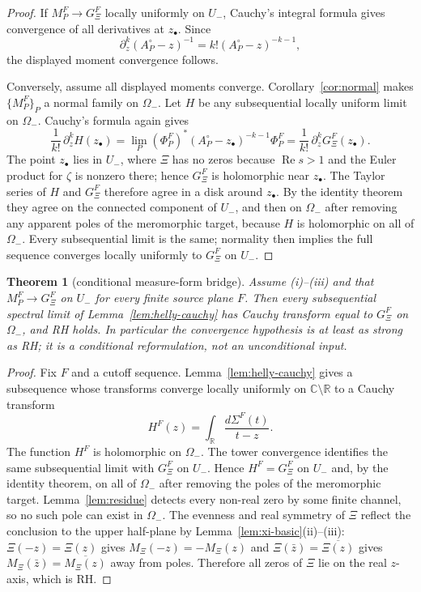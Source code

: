 \documentclass[11pt]{amsart}
\newtheorem{theorem}{Theorem}[section]
\theoremstyle{definition}
\theoremstyle{remark}
\theoremstyle{definition}
\renewcommand{\Re}{\operatorname{Re}}
\newcommand{\R}{\mathbb{R}}
\newcommand{\C}{\mathbb{C}}
\newcommand{\GXi}{G_\Xi}
\begin{document}
\begin{proof}
If $M_P^F\to\GXi^F$ locally uniformly on $U_-$, Cauchy's integral formula gives convergence of all
derivatives at $z_\bullet$.  Since
\[
   \partial_z^k(A_P^\circ-z)^{-1}=k!(A_P^\circ-z)^{-k-1},
\]
the displayed moment convergence follows.

Conversely, assume all displayed moments converge.  Corollary~\ref{cor:normal} makes
$\{M_P^F\}_P$ a normal family on $\Omega_-$.  Let $H$ be any subsequential locally uniform limit on
$\Omega_-$.  Cauchy's formula again gives
\[
   \frac{1}{k!}\,\partial_z^kH(z_\bullet)
   =
   \lim_P(\Phi_P^F)^*(A_P^\circ-z_\bullet)^{-k-1}\Phi_P^F
   =
   \frac{1}{k!}\,\partial_z^k\GXi^F(z_\bullet).
\]
The point $z_\bullet$ lies in $U_-$, where $\Xi$ has no zeros because $\Re s>1$ and the Euler product for
$\zeta$ is nonzero there; hence $\GXi^F$ is holomorphic near $z_\bullet$.  The Taylor series of $H$ and
$\GXi^F$ therefore agree in a disk around $z_\bullet$.  By the identity theorem they agree on the
connected component of $U_-$, and then on $\Omega_-$ after removing any apparent poles of the meromorphic
target, because $H$ is holomorphic on all of $\Omega_-$.  Every subsequential limit is the same; normality
then implies the full sequence converges locally uniformly to $\GXi^F$ on $U_-$.
\end{proof}

\begin{theorem}[conditional measure-form bridge]\label{thm:measure-bridge}
Assume \textnormal{(i)--(iii)} and that $M_P^F\to\GXi^F$ on $U_-$ for every finite source plane $F$.
Then every subsequential spectral limit of Lemma~\ref{lem:helly-cauchy} has Cauchy transform equal to
$\GXi^F$ on $\Omega_-$, and RH holds.  In particular the convergence hypothesis is at least as strong
as RH; it is a conditional reformulation, not an unconditional input.
\end{theorem}

\begin{proof}
Fix $F$ and a cutoff sequence.  Lemma~\ref{lem:helly-cauchy} gives a subsequence whose transforms converge
locally uniformly on $\C\setminus\R$ to a Cauchy transform
\[
   H^F(z)=\int_\R\frac{d\Sigma^F(t)}{t-z}.
\]
The function $H^F$ is holomorphic on $\Omega_-$.  The tower convergence identifies the same
subsequential limit with $\GXi^F$ on $U_-$.  Hence $H^F=\GXi^F$ on $U_-$ and, by the identity theorem,
on all of $\Omega_-$ after
removing the poles of the meromorphic target.  Lemma~\ref{lem:residue} detects every non-real zero by
some finite channel, so no such pole can exist in $\Omega_-$.  The evenness and real symmetry of $\Xi$
reflect the conclusion to the upper half-plane by Lemma~\ref{lem:xi-basic}(ii)--(iii):
$\Xi(-z)=\Xi(z)$ gives $M_\Xi(-z)=-M_\Xi(z)$ and $\Xi(\bar z)=\overline{\Xi(z)}$ gives
$M_\Xi(\bar z)=\overline{M_\Xi(z)}$ away from poles.  Therefore all zeros of $\Xi$ lie on the real
$z$-axis, which is RH.
\end{proof}
\end{document}
